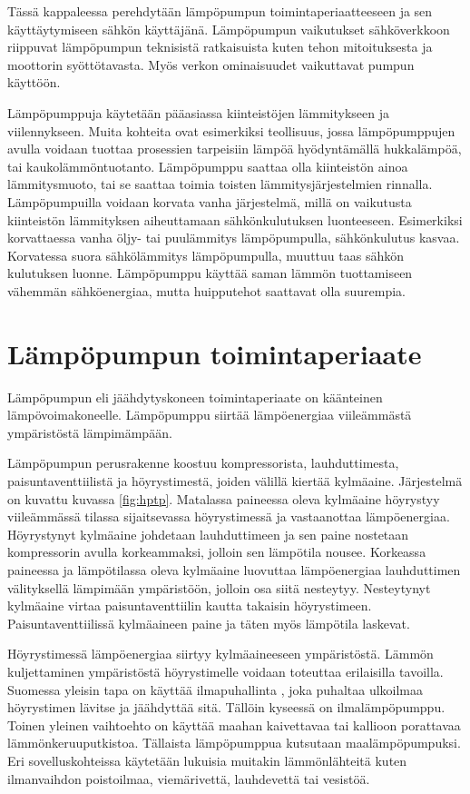 Tässä kappaleessa perehdytään lämpöpumpun toimintaperiaatteeseen ja sen käyttäytymiseen sähkön käyttäjänä. Lämpöpumpun vaikutukset sähköverkkoon riippuvat lämpöpumpun teknisistä ratkaisuista kuten tehon mitoituksesta ja moottorin syöttötavasta. Myös verkon ominaisuudet vaikuttavat pumpun käyttöön.

Lämpöpumppuja käytetään pääasiassa kiinteistöjen lämmitykseen ja viilennykseen. Muita kohteita ovat esimerkiksi teollisuus, jossa lämpöpumppujen avulla voidaan tuottaa prosessien tarpeisiin lämpöä hyödyntämällä hukkalämpöä, tai kaukolämmöntuotanto. \parencite{Setala, katriVala} Lämpöpumppu saattaa olla kiinteistön ainoa lämmitysmuoto, tai se saattaa toimia toisten lämmitysjärjestelmien rinnalla. Lämpöpumpuilla voidaan korvata vanha järjestelmä, millä on vaikutusta kiinteistön lämmityksen aiheuttamaan sähkönkulutuksen luonteeseen. Esimerkiksi korvattaessa vanha öljy- tai puulämmitys lämpöpumpulla, sähkönkulutus kasvaa. Korvatessa suora sähkölämmitys lämpöpumpulla, muuttuu taas sähkön kulutuksen luonne. Lämpöpumppu käyttää saman lämmön tuottamiseen vähemmän sähköenergiaa, mutta huipputehot saattavat olla suurempia.

\section{Lämpöpumpun toimintaperiaate}
  Lämpöpumpun eli jäähdytyskoneen toimintaperiaate on käänteinen lämpövoimakoneelle. Lämpöpumppu siirtää lämpöenergiaa viileämmästä ympäristöstä lämpimämpään. \parencite{DincerRosen}

  Lämpöpumpun perusrakenne koostuu kompressorista, lauhduttimesta, paisuntaventtiilistä ja höyrystimestä, joiden välillä kiertää kylmäaine. Järjestelmä on kuvattu kuvassa \ref{fig:hptp}. Matalassa paineessa oleva kylmäaine höyrystyy viileämmässä tilassa sijaitsevassa höyrystimessä ja vastaanottaa lämpöenergiaa. Höyrystynyt kylmäaine johdetaan lauhduttimeen ja sen paine nostetaan kompressorin avulla korkeammaksi, jolloin sen lämpötila nousee. Korkeassa paineessa ja lämpötilassa oleva kylmäaine luovuttaa lämpöenergiaa lauhduttimen välityksellä lämpimään ympäristöön, jolloin osa siitä nesteytyy. Nesteytynyt kylmäaine virtaa paisuntaventtiilin kautta takaisin höyrystimeen. Paisuntaventtiilissä kylmäaineen paine ja täten myös lämpötila laskevat. \parencite{DincerRosen}

  Höyrystimessä lämpöenergiaa siirtyy kylmäaineeseen ympäristöstä. Lämmön kuljettaminen ympäristöstä höyrystimelle voidaan toteuttaa erilaisilla tavoilla. Suomessa yleisin tapa on käyttää ilmapuhallinta \parencite{sulpu}, joka puhaltaa ulkoilmaa höyrystimen lävitse ja jäähdyttää sitä. Tällöin kyseessä on ilmalämpöpumppu. Toinen yleinen vaihtoehto on käyttää maahan kaivettavaa tai kallioon porattavaa lämmönkeruuputkistoa. Tällaista lämpöpumppua kutsutaan maalämpöpumpuksi. Eri sovelluskohteissa käytetään lukuisia muitakin lämmönlähteitä kuten ilmanvaihdon poistoilmaa, viemärivettä, lauhdevettä tai vesistöä. \parencite{DincerRosen}


